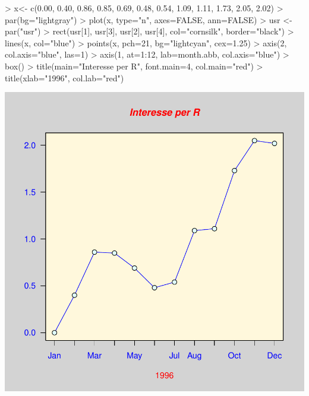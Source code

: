 \documentclass[onecolumn,11pt]{book}
\begin{document}
  
\begin{Schunk}
\begin{Sinput}
> x<- c(0.00, 0.40, 0.86, 0.85, 0.69, 0.48, 0.54, 1.09, 1.11, 1.73, 2.05, 2.02)
> par(bg="lightgray")
> plot(x, type="n", axes=FALSE, ann=FALSE)
> usr <- par("usr")
> rect(usr[1], usr[3], usr[2], usr[4], col="cornsilk", border="black")
> lines(x, col="blue")
> points(x, pch=21, bg="lightcyan", cex=1.25)
> axis(2, col.axis="blue", las=1)
> axis(1, at=1:12, lab=month.abb, col.axis="blue")
> box()
> title(main="Interesse per R", font.main=4, col.main="red")
> title(xlab="1996", col.lab="red")
\end{Sinput}
\end{Schunk}
\includegraphics{statisticaconR-353}
\end{document}
